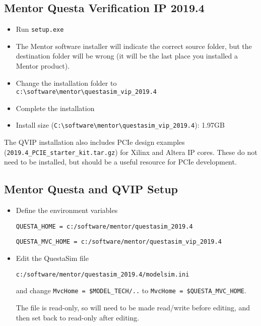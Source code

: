 \documentclass[10pt,twoside]{article}
\begin{document}
\subsection{Mentor Questa Verification IP 2019.4}

\begin{itemize}
\item Run \verb+setup.exe+
\item The Mentor software installer will indicate the correct source folder,
but the destination folder will be wrong (it will be the last place you
installed a Mentor product).
\item Change the installation folder to
\verb+c:\software\mentor\questasim_vip_2019.4+
\item Complete the installation
\item Install size (\verb+C:\software\mentor\questasim_vip_2019.4+): 1.97GB
\end{itemize}

The QVIP installation also includes PCIe design examples
(\verb+2019.4_PCIE_starter_kit.tar.gz+) for Xilinx and Altera IP cores.
These do not need to be installed, but should be a useful resource for
PCIe development.

\clearpage
\subsection{Mentor Questa and QVIP Setup}

\begin{itemize}
\item Define the environment variables

\verb+QUESTA_HOME = c:/software/mentor/questasim_2019.4+

\verb+QUESTA_MVC_HOME = c:/software/mentor/questasim_vip_2019.4+

\item Edit the QuestaSim file

\verb+c:/software/mentor/questasim_2019.4/modelsim.ini+

and change \verb+MvcHome = $MODEL_TECH/..+ to \verb+MvcHome = $QUESTA_MVC_HOME+.

The file is read-only, so will need to be made read/write before editing,
and then set back to read-only after editing.
\end{itemize}
\end{document}
